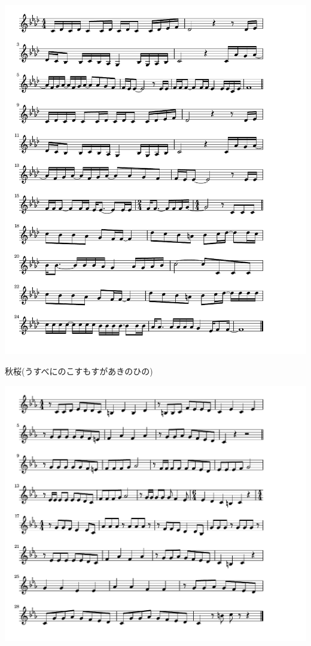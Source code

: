 \documentclass[a4paper]{ltjsarticle}
\begin{document}
\includegraphics[clip]{cosmos_crop.pdf}

\vspace{-10mm} \hspace{10mm}
秋桜(うすべにのこすもすがあきのひの)

\includegraphics[clip]{dango3kyodai_crop.pdf}
\end{document}
